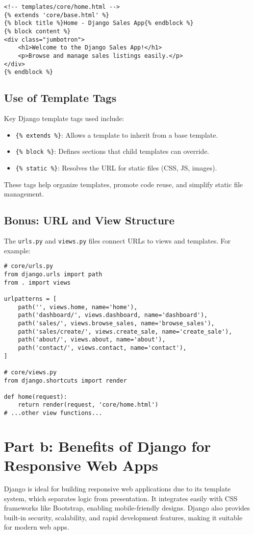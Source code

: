 \documentclass[12pt]{article}
\begin{document}
\begin{verbatim}
<!-- templates/core/home.html -->
{% extends 'core/base.html' %}
{% block title %}Home - Django Sales App{% endblock %}
{% block content %}
<div class="jumbotron">
    <h1>Welcome to the Django Sales App!</h1>
    <p>Browse and manage sales listings easily.</p>
</div>
{% endblock %}
\end{verbatim}

\subsection{Use of Template Tags}
Key Django template tags used include:
\begin{itemize}
    \item \verb|{% extends %}|: Allows a template to inherit from a base template.
    \item \verb|{% block %}|: Defines sections that child templates can override.
    \item \verb|{% static %}|: Resolves the URL for static files (CSS, JS, images).
\end{itemize}
These tags help organize templates, promote code reuse, and simplify static file management.

\subsection{Bonus: URL and View Structure}
The \texttt{urls.py} and \texttt{views.py} files connect URLs to views and templates. For example:

\begin{verbatim}
# core/urls.py
from django.urls import path
from . import views

urlpatterns = [
    path('', views.home, name='home'),
    path('dashboard/', views.dashboard, name='dashboard'),
    path('sales/', views.browse_sales, name='browse_sales'),
    path('sales/create/', views.create_sale, name='create_sale'),
    path('about/', views.about, name='about'),
    path('contact/', views.contact, name='contact'),
]

# core/views.py
from django.shortcuts import render

def home(request):
    return render(request, 'core/home.html')
# ...other view functions...
\end{verbatim}

\section{Part b: Benefits of Django for Responsive Web Apps}
Django is ideal for building responsive web applications due to its template system, which separates logic from presentation. It integrates easily with CSS frameworks like Bootstrap, enabling mobile-friendly designs. Django also provides built-in security, scalability, and rapid development features, making it suitable for modern web apps.
\end{document}
